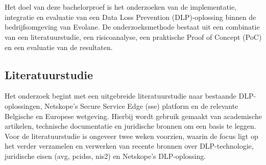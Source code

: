 
\chapter{}%
\label{ch:methodologie}


Het doel van deze bachelorproef is het onderzoeken van de implementatie, integratie en evaluatie van een Data Loss Prevention (DLP)-oplossing binnen de bedrijfsomgeving van Evolane.
De onderzoeksmethode bestaat uit een combinatie van een literatuurstudie, een risicoanalyse, een praktische Proof of Concept (PoC) en een evaluatie van de resultaten.

\section{Literatuurstudie}%

Het onderzoek begint met een uitgebreide literatuurstudie naar bestaande DLP-oplossingen, Netskope's Secure Service Edge (\gls{sse}) platform en de relevante Belgische en Europese wetgeving. 
Hierbij wordt gebruik gemaakt van academische artikelen, technische documentatie en juridische bronnen om een basis te leggen. 
Voor de literatuurstudie is ongeveer twee weken voorzien, waarin de focus ligt op het verder verzamelen en verwerken van recente bronnen
over DLP-technologie, juridische eisen (\gls{avg}, \gls{pcidss}, \gls{nis2}) en Netskope's DLP-oplossing.

